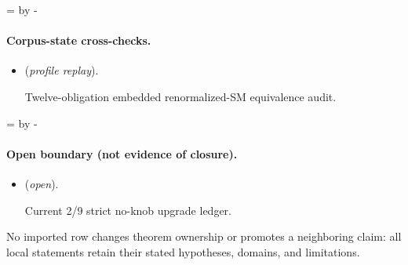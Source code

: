 \documentclass[11pt]{article}
\theoremstyle{definition}
\theoremstyle{remark}
\begin{document}
\par\begingroup{}=\pagegoal\advance{} by -\pagetotal\ifdim\dimen0<7\baselineskip\newpage\fi\endgroup
\paragraph{Corpus-state cross-checks.}
\begin{itemize}
\setlength{\itemsep}{0.25em}
\item {} (\emph{profile replay}).\par Twelve-obligation embedded renormalized-SM equivalence audit.
\end{itemize}

\par\begingroup{}=\pagegoal\advance{} by -\pagetotal\ifdim\dimen0<7\baselineskip\newpage\fi\endgroup
\paragraph{Open boundary (not evidence of closure).}
\begin{itemize}
\setlength{\itemsep}{0.25em}
\item {} (\emph{open}).\par Current 2/9 strict no-knob upgrade ledger.
\end{itemize}

No imported row changes theorem ownership or promotes a neighboring claim: all local statements retain their stated hypotheses, domains, and limitations.
\end{document}
